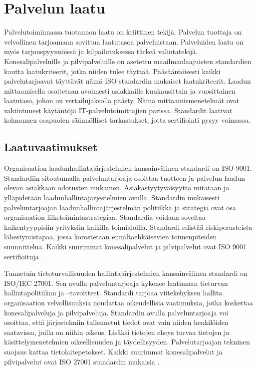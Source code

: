 \chapter{Palvelun laatu\label{laatu}}
Palvelutoiminnassa tuotannon laatu on kriittinen tekijä. Palvelun tuottaja on velvollinen tarjoamaan sovittua laatutasoa palveluistaan. Palveluiden laatu on myös tarjouspyynnöissä ja kilpailutuksessa tärkeä valintatekijä. Konesalipalveluille ja pilvipalveluille on asetettu maailmanlaajuisten standardien kautta laatukriteerit, jotka niiden tulee täyttää. Pääsääntöisesti kaikki palvelutarjoavat täyttävät nämä ISO standardin mukaiset laatukriteerit. Laadun mittaamisella osoitetaan avoimesti asiakkaille kuukausittain ja vuosittainen laatutaso, johon on vertailujaksolla päästy. Nämä mittaamismenetelmät ovat vakiintuneet käytäntöjä IT-palvelutoimittajien parissa. Standardit laativat kolmannen osapuolen säännölliset tarkastukset, jotta sertifiointi pysyy voimassa.
\section{Laatuvaatimukset}

Organisaation laadunhallintajärjestelmien kansainvälinen standardi on ISO 9001. Standardiin sitoutumalla palveluntarjoaja osoittaa tuotteen ja palvelun laadun olevan asiakkaan odotusten mukainen. Asiakastyytyväisyyttä mitataan ja ylläpidetään laadunhallintajärjestelmien avulla. Standardin mukaisesti palveluntarjoajan laadunhallintajärjestelmän politiikka ja strategia ovat osa organisaation liiketoimintastrategiaa. Standardia voidaan soveltaa kaikentyyppisiin yrityksiin kaikilla toimialoilla. Standardi edistää riskiperusteista lähestymistapaa, jossa korostetaan ennaltaehkäisevien toimenpiteiden suunnittelua. Kaikki suurimmat konesalipalvelut ja pilvipalvelut ovat ISO 9001 sertifioituja \citep{borenstein2011cloud} \citep{iso9001}.

Tunnetuin tietoturvallisuuden hallintajärjestelmien kansainvälinen standardi on ISO/IEC 27001. Sen avulla palveluntarjoaja kykenee laatimaan tieturvan hallintapolitiikan ja –tavoitteet. Standardi tarjoaa viitekehyksen hallita organisaation velvollisuuksia noudattaa oikeudellisia vaatimuksia, jotka koskettaa konesalipalveluja ja pilvipalveluja. Standardin avulla palveluntarjoaja voi osoittaa, että järjestelmiin tallennetut tiedot ovat vain niiden henkilöiden saatavissa, joilla on niihin oikeus. Lisäksi tietojen eheys turvaa tietojen ja käsittelymenetelmien oikeellisuuden ja täydellisyyden. Palvelutarjoajan tekninen suojaus kattaa tietolaitepetokset. Kaikki suurimmat konesalipalvelut ja pilvipalvelut ovat ISO 27001 standardin mukaisia \citep{pattern} \citep{iso27001}.

